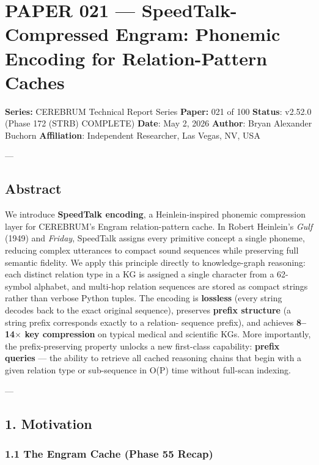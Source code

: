 \section{PAPER 021 — SpeedTalk-Compressed Engram: Phonemic Encoding for Relation-Pattern Caches}

\textbf{Series:} CEREBRUM Technical Report Series  
\textbf{Paper:} 021 of 100  
\textbf{Status}: v2.52.0 (Phase 172 (STRB) COMPLETE)
\textbf{Date}: May 2, 2026
\textbf{Author}: Bryan Alexander Buchorn  
\textbf{Affiliation}: Independent Researcher, Las Vegas, NV, USA  

---

\subsection{Abstract}

We introduce \textbf{SpeedTalk encoding}, a Heinlein-inspired phonemic compression layer
for CEREBRUM's Engram relation-pattern cache.  In Robert Heinlein's \textit{Gulf} (1949) and
\textit{Friday}, SpeedTalk assigns every primitive concept a single phoneme, reducing complex
utterances to compact sound sequences while preserving full semantic fidelity.  We
apply this principle directly to knowledge-graph reasoning: each distinct relation type
in a KG is assigned a single character from a 62-symbol alphabet, and multi-hop
relation sequences are stored as compact strings rather than verbose Python tuples.
The encoding is \textbf{lossless} (every string decodes back to the exact original sequence),
preserves \textbf{prefix structure} (a string prefix corresponds exactly to a relation-
sequence prefix), and achieves \textbf{8–14$\times$ key compression} on typical medical and
scientific KGs.  More importantly, the prefix-preserving property unlocks a new
first-class capability: \textbf{prefix queries} — the ability to retrieve all cached
reasoning chains that begin with a given relation type or sub-sequence in O(P)
time without full-scan indexing.

---

\subsection{1. Motivation}

\subsubsection{1.1 The Engram Cache (Phase 55 Recap)}

